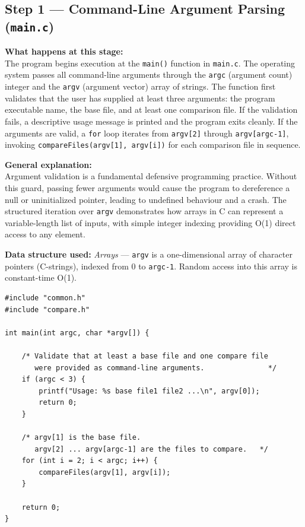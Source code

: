 \documentclass[12pt,a4paper]{article}
\begin{document}
\subsection{Step 1 — Command-Line Argument Parsing (\texttt{main.c})}

\textbf{What happens at this stage:}\\
The program begins execution at the \texttt{main()} function in \texttt{main.c}. The operating system passes all command-line arguments through the \texttt{argc} (argument count) integer and the \texttt{argv} (argument vector) array of strings. The function first validates that the user has supplied at least three arguments: the program executable name, the base file, and at least one comparison file. If the validation fails, a descriptive usage message is printed and the program exits cleanly. If the arguments are valid, a \texttt{for} loop iterates from \texttt{argv[2]} through \texttt{argv[argc-1]}, invoking \texttt{compareFiles(argv[1], argv[i])} for each comparison file in sequence.

\smallskip
\textbf{General explanation:}\\
Argument validation is a fundamental defensive programming practice. Without this guard, passing fewer arguments would cause the program to dereference a null or uninitialized pointer, leading to undefined behaviour and a crash. The structured iteration over \texttt{argv} demonstrates how arrays in C can represent a variable-length list of inputs, with simple integer indexing providing O(1) direct access to any element.

\smallskip
\textbf{Data structure used:} \textit{Arrays} — \texttt{argv} is a one-dimensional array of character pointers (C-strings), indexed from 0 to \texttt{argc-1}. Random access into this array is constant-time O(1).

\begin{lstlisting}[caption={\texttt{main.c} -- Entry point, argument parsing, and comparison loop}]
#include "common.h"
#include "compare.h"

int main(int argc, char *argv[]) {

    /* Validate that at least a base file and one compare file
       were provided as command-line arguments.               */
    if (argc < 3) {
        printf("Usage: %s base file1 file2 ...\n", argv[0]);
        return 0;
    }

    /* argv[1] is the base file.
       argv[2] ... argv[argc-1] are the files to compare.   */
    for (int i = 2; i < argc; i++) {
        compareFiles(argv[1], argv[i]);
    }

    return 0;
}
\end{lstlisting}
\end{document}
